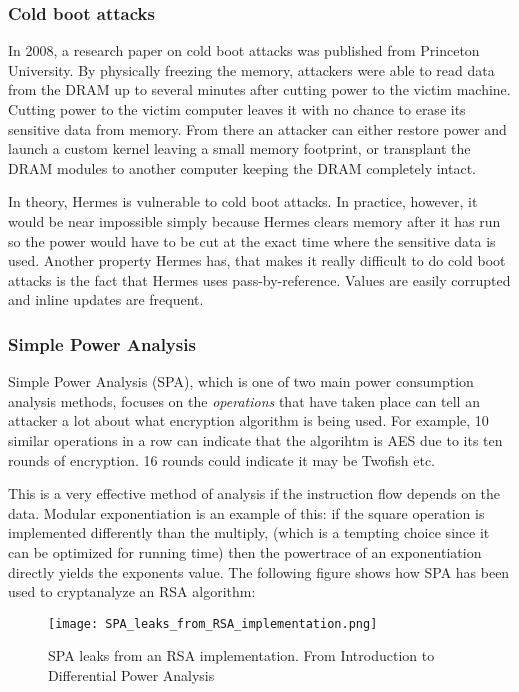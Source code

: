 \subsubsection{Cold boot attacks}
In 2008, a research paper on cold boot attacks\cite{Halderman2008LestKeys} was published from Princeton University. By physically freezing the memory, attackers were able to read data from the DRAM up to several minutes after cutting power to the victim machine. Cutting power to the victim computer leaves it with no chance to erase its sensitive data from memory. From there an attacker can either restore power and launch a custom kernel leaving a small memory footprint, or transplant the DRAM modules to another computer keeping the DRAM completely intact.

In theory, Hermes is vulnerable to cold boot attacks. In practice, however, it would be near impossible simply because Hermes clears memory after it has run so the power would have to be cut at the exact time where the sensitive data is used. Another property Hermes has, that makes it really difficult to do cold boot attacks is the fact that Hermes uses pass-by-reference. Values are easily corrupted and inline updates are frequent.

\subsubsection{Simple Power Analysis}
Simple Power Analysis (SPA), which is one of two main power consumption analysis methods, focuses on the \emph{operations} that have taken place can tell an attacker a lot about what encryption algorithm is being used.
For example, 10 similar operations in a row can indicate that the algorihtm is AES due to its ten rounds of encryption. 16 rounds could indicate it may be Twofish etc.

This is a very effective method of analysis if the instruction flow depends on the data. 
Modular exponentiation is an example of this: if the square operation is implemented differently than the multiply, (which is a tempting choice since it can be optimized for running time) then the powertrace of an exponentiation directly yields the exponents value.
The following figure shows how SPA has been used to cryptanalyze an RSA algorithm:
\begin{figure}[h!]
  \begin{center}
    \texttt{[image: SPA\_leaks\_from\_RSA\_implementation.png]} \\
  \end{center}
  \caption[caption]{SPA leaks from an RSA implementation. \hspace{\textwidth} From Introduction to Differential Power Analysis \cite{KOCHER2011}}
\end{figure}

\clearpage
\newpage


